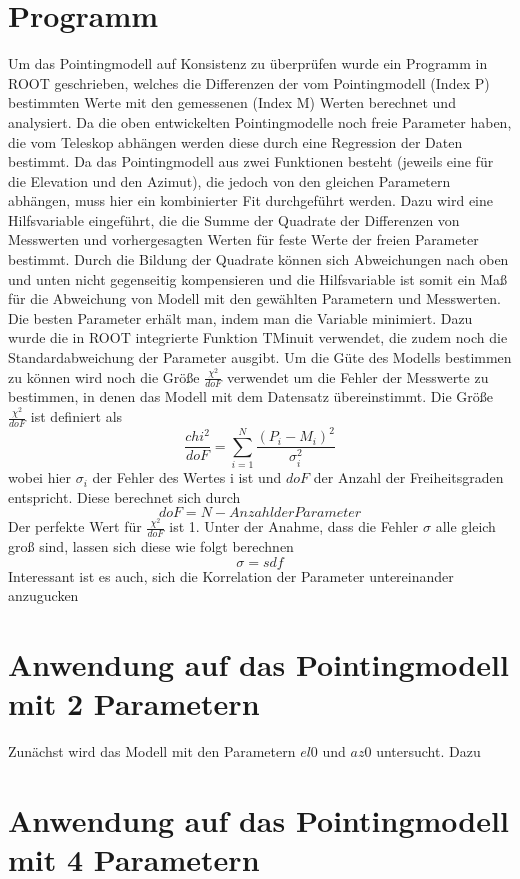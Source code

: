 \section{Programm}
Um das Pointingmodell auf Konsistenz zu überprüfen wurde ein Programm in ROOT geschrieben, welches die Differenzen der vom Pointingmodell (Index P) bestimmten Werte mit den gemessenen (Index M) Werten berechnet und analysiert. Da die oben entwickelten Pointingmodelle noch freie Parameter haben, die vom Teleskop abhängen werden diese durch eine Regression der Daten bestimmt. Da das Pointingmodell aus zwei Funktionen besteht (jeweils eine für die Elevation und den Azimut), die jedoch von den gleichen Parametern abhängen, muss hier ein kombinierter Fit durchgeführt werden. Dazu wird eine Hilfsvariable eingeführt, die die Summe der Quadrate der Differenzen von Messwerten und vorhergesagten Werten für feste Werte der freien Parameter bestimmt. Durch die Bildung der Quadrate können sich Abweichungen nach oben und unten nicht gegenseitig kompensieren und die Hilfsvariable ist somit ein Maß für die Abweichung von Modell mit den gewählten Parametern und Messwerten. Die besten Parameter erhält man, indem man die Variable minimiert. Dazu wurde die in ROOT integrierte Funktion TMinuit verwendet, die zudem noch die Standardabweichung der Parameter ausgibt. Um die Güte des Modells bestimmen zu können wird noch die Größe $\frac{\chi^2}{doF}$ verwendet um die Fehler der Messwerte zu bestimmen, in denen das Modell mit dem Datensatz übereinstimmt. Die Größe $\frac{\chi^2}{doF}$ ist definiert als
\begin{equation}
\frac{chi^2}{doF}=\sum^N_{i=1}\frac{\left(P_i-M_i\right)^2}{\sigma_i^2}
\end{equation}
wobei hier $\sigma_i$ der Fehler des Wertes i ist und $doF$ der Anzahl der Freiheitsgraden entspricht. Diese berechnet sich durch
\begin{equation}
doF=N-Anzahl der Parameter
\end{equation}
Der perfekte Wert für $\frac{\chi^2}{doF}$ ist 1. Unter der Anahme, dass die Fehler $\sigma$ alle gleich groß sind, lassen sich diese wie folgt berechnen
\begin{equation}
\sigma=sdf
\end{equation}
Interessant ist es auch, sich die Korrelation der Parameter untereinander anzugucken

\section{Anwendung auf das Pointingmodell mit 2 Parametern}
Zunächst wird das Modell mit den Parametern $el0$ und $az0$ untersucht. Dazu 

\section{Anwendung auf das Pointingmodell mit 4 Parametern}